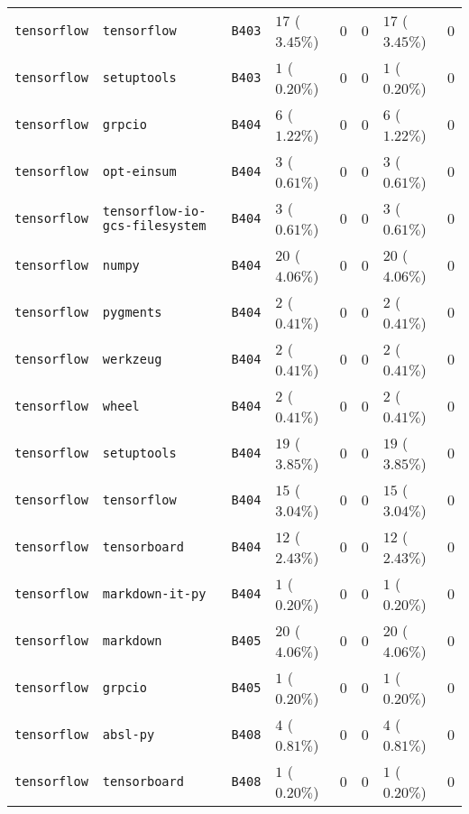 \begin{table}
\begin{tabular}{llllllll}
\texttt{tensorflow} & \texttt{tensorflow} & \texttt{B403} & $17$ ($3.45\%$) & $0$ & $0$ & $17$ ($3.45\%$) & $0$ \\
\texttt{tensorflow} & \texttt{setuptools} & \texttt{B403} & $1$ ($0.20\%$) & $0$ & $0$ & $1$ ($0.20\%$) & $0$ \\
\texttt{tensorflow} & \texttt{grpcio} & \texttt{B404} & $6$ ($1.22\%$) & $0$ & $0$ & $6$ ($1.22\%$) & $0$ \\
\texttt{tensorflow} & \texttt{opt-einsum} & \texttt{B404} & $3$ ($0.61\%$) & $0$ & $0$ & $3$ ($0.61\%$) & $0$ \\
\texttt{tensorflow} & \texttt{tensorflow-io-gcs-filesystem} & \texttt{B404} & $3$ ($0.61\%$) & $0$ & $0$ & $3$ ($0.61\%$) & $0$ \\
\texttt{tensorflow} & \texttt{numpy} & \texttt{B404} & $20$ ($4.06\%$) & $0$ & $0$ & $20$ ($4.06\%$) & $0$ \\
\texttt{tensorflow} & \texttt{pygments} & \texttt{B404} & $2$ ($0.41\%$) & $0$ & $0$ & $2$ ($0.41\%$) & $0$ \\
\texttt{tensorflow} & \texttt{werkzeug} & \texttt{B404} & $2$ ($0.41\%$) & $0$ & $0$ & $2$ ($0.41\%$) & $0$ \\
\texttt{tensorflow} & \texttt{wheel} & \texttt{B404} & $2$ ($0.41\%$) & $0$ & $0$ & $2$ ($0.41\%$) & $0$ \\
\texttt{tensorflow} & \texttt{setuptools} & \texttt{B404} & $19$ ($3.85\%$) & $0$ & $0$ & $19$ ($3.85\%$) & $0$ \\
\texttt{tensorflow} & \texttt{tensorflow} & \texttt{B404} & $15$ ($3.04\%$) & $0$ & $0$ & $15$ ($3.04\%$) & $0$ \\
\texttt{tensorflow} & \texttt{tensorboard} & \texttt{B404} & $12$ ($2.43\%$) & $0$ & $0$ & $12$ ($2.43\%$) & $0$ \\
\texttt{tensorflow} & \texttt{markdown-it-py} & \texttt{B404} & $1$ ($0.20\%$) & $0$ & $0$ & $1$ ($0.20\%$) & $0$ \\
\texttt{tensorflow} & \texttt{markdown} & \texttt{B405} & $20$ ($4.06\%$) & $0$ & $0$ & $20$ ($4.06\%$) & $0$ \\
\texttt{tensorflow} & \texttt{grpcio} & \texttt{B405} & $1$ ($0.20\%$) & $0$ & $0$ & $1$ ($0.20\%$) & $0$ \\
\texttt{tensorflow} & \texttt{absl-py} & \texttt{B408} & $4$ ($0.81\%$) & $0$ & $0$ & $4$ ($0.81\%$) & $0$ \\
\texttt{tensorflow} & \texttt{tensorboard} & \texttt{B408} & $1$ ($0.20\%$) & $0$ & $0$ & $1$ ($0.20\%$) & $0$ \\

\end{tabular}
\end{table}
